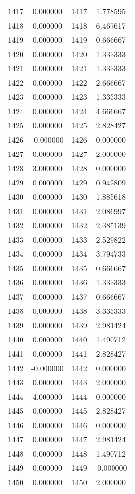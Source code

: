 \documentclass[12pt]{article}
\begin{document}
\begin{longtable}{@{}cccc@{}}
1417 & 0.000000 & 1417 & 1.778595 \\
1418 & 0.000000 & 1418 & 6.467617 \\
1419 & 0.000000 & 1419 & 0.666667 \\
1420 & 0.000000 & 1420 & 1.333333 \\
1421 & 0.000000 & 1421 & 1.333333 \\
1422 & 0.000000 & 1422 & 2.666667 \\
1423 & 0.000000 & 1423 & 1.333333 \\
1424 & 0.000000 & 1424 & 4.666667 \\
1425 & 0.000000 & 1425 & 2.828427 \\
1426 & -0.000000 & 1426 & 0.000000 \\
1427 & 0.000000 & 1427 & 2.000000 \\
1428 & 3.000000 & 1428 & 0.000000 \\
1429 & 0.000000 & 1429 & 0.942809 \\
1430 & 0.000000 & 1430 & 1.885618 \\
1431 & 0.000000 & 1431 & 2.086997 \\
1432 & 0.000000 & 1432 & 2.385139 \\
1433 & 0.000000 & 1433 & 2.529822 \\
1434 & 0.000000 & 1434 & 3.794733 \\
1435 & 0.000000 & 1435 & 0.666667 \\
1436 & 0.000000 & 1436 & 1.333333 \\
1437 & 0.000000 & 1437 & 0.666667 \\
1438 & 0.000000 & 1438 & 3.333333 \\
1439 & 0.000000 & 1439 & 2.981424 \\
1440 & 0.000000 & 1440 & 1.490712 \\
1441 & 0.000000 & 1441 & 2.828427 \\
1442 & -0.000000 & 1442 & 0.000000 \\
1443 & 0.000000 & 1443 & 2.000000 \\
1444 & 4.000000 & 1444 & 0.000000 \\
1445 & 0.000000 & 1445 & 2.828427 \\
1446 & 0.000000 & 1446 & 0.000000 \\
1447 & 0.000000 & 1447 & 2.981424 \\
1448 & 0.000000 & 1448 & 1.490712 \\
1449 & 0.000000 & 1449 & -0.000000 \\
1450 & 0.000000 & 1450 & 2.000000 \\

\end{longtable}
\end{document}
